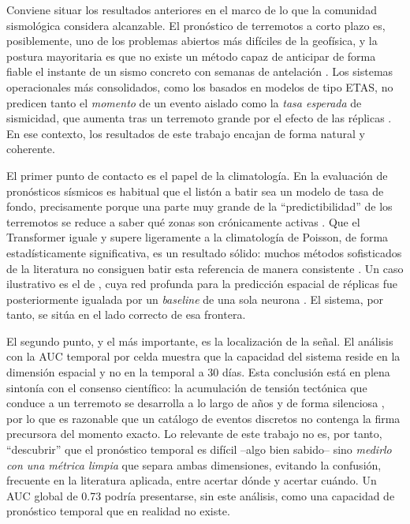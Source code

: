 Conviene situar los resultados anteriores en el marco de lo que la comunidad sismológica
considera alcanzable. El pronóstico de terremotos a corto plazo es, posiblemente, uno de los
problemas abiertos más difíciles de la geofísica, y la postura mayoritaria es que no existe un
método capaz de anticipar de forma fiable el instante de un sismo concreto con semanas de
antelación \citep{geller1997unpredictable, jordan2011oef}. Los sistemas operacionales más consolidados, como los basados en modelos de tipo
ETAS, no predicen tanto el \emph{momento} de un evento aislado como la \emph{tasa esperada} de
sismicidad, que aumenta tras un terremoto grande por el efecto de las réplicas \citep{ogata1988etas, marzocchi2014oef}. En ese contexto,
los resultados de este trabajo encajan de forma natural y coherente.

El primer punto de contacto es el papel de la climatología. En la evaluación de pronósticos
sísmicos es habitual que el listón a batir sea un modelo de tasa de fondo, precisamente porque
una parte muy grande de la ``predictibilidad'' de los terremotos se reduce a saber qué zonas son
crónicamente activas \citep{helmstetter2006comparison}. Que el Transformer iguale y supere ligeramente a la climatología de
Poisson, de forma estadísticamente significativa, es un resultado sólido: muchos métodos
sofisticados de la literatura no consiguen batir esta referencia de manera consistente
\citep{zechar2008testing, beroza2021dlreview}. Un caso ilustrativo es el de
\citet{devries2018aftershocks}, cuya red profunda para la predicción espacial de réplicas fue
posteriormente igualada por un \textit{baseline} de una sola neurona \citep{mignan2019oneneuron}. El
sistema, por tanto, se sitúa en el lado correcto de esa frontera.

El segundo punto, y el más importante, es la localización de la señal. El análisis con la AUC
temporal por celda muestra que la capacidad del sistema reside en la dimensión espacial y no en
la temporal a 30 días. Esta conclusión está en plena sintonía con el consenso científico: la
acumulación de tensión tectónica que conduce a un terremoto se desarrolla a lo largo de años y
de forma silenciosa \citep{stein2003introduction}, por lo que es razonable que un catálogo de eventos discretos no contenga la
firma precursora del momento exacto. Lo relevante de este trabajo no es, por tanto, ``descubrir''
que el pronóstico temporal es difícil --algo bien sabido-- sino \emph{medirlo con una métrica
  limpia} que separa ambas dimensiones, evitando la confusión, frecuente en la literatura aplicada,
entre acertar dónde y acertar cuándo. Un AUC global de 0.73 podría presentarse, sin este
análisis, como una capacidad de pronóstico temporal que en realidad no existe.

